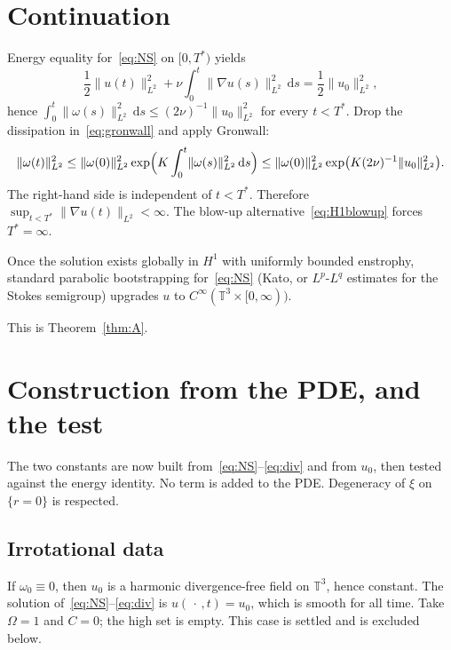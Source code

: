 \documentclass[11pt,a4paper]{article}
\theoremstyle{definition}
\theoremstyle{remark}
\newcommand{\T}{\mathbb{T}}
\newcommand{\norm}[1]{\lVert#1\rVert}
\newcommand{\dd}{\mathrm{d}}
\begin{document}
\section{Continuation}

Energy equality for~\eqref{eq:NS} on \([0,T^*)\) yields
\begin{equation}
\label{eq:energy}
\frac12\norm{u(t)}_{L^2}^2+\nu\int_0^t\norm{\nabla u(s)}_{L^2}^2\,\dd s
=\frac12\norm{u_0}_{L^2}^2,
\end{equation}
hence \(\int_0^{t}\norm{\omega(s)}_{L^2}^2\,\dd s\le (2\nu)^{-1}\norm{u_0}_{L^2}^2\)
for every \(t<T^*\). Drop the dissipation in~\eqref{eq:gronwall} and apply
Gronwall:
\begin{equation}
\label{eq:bound}
\norm{\omega(t)}_{L^2}^2
\le \norm{\omega(0)}_{L^2}^2
\exp\Bigl(K\int_0^t\norm{\omega(s)}_{L^2}^2\,\dd s\Bigr)
\le \norm{\omega(0)}_{L^2}^2
\exp\bigl(K(2\nu)^{-1}\norm{u_0}_{L^2}^2\bigr).
\end{equation}
The right-hand side is independent of \(t<T^*\). Therefore
\(\sup_{t<T^*}\norm{\nabla u(t)}_{L^2}<\infty\). The blow-up
alternative~\eqref{eq:H1blowup} forces \(T^*=\infty\).

Once the solution exists globally in \(H^1\) with uniformly bounded
enstrophy, standard parabolic bootstrapping for~\eqref{eq:NS} (Kato,
or \(L^p\)-\(L^q\) estimates for the Stokes semigroup) upgrades
\(u\) to \(C^\infty(\T^3\times[0,\infty))\).

This is Theorem~\ref{thm:A}.

\section{Construction from the PDE, and the test}
\label{sec:test}

The two constants are now built from~\eqref{eq:NS}--\eqref{eq:div} and
from \(u_0\), then tested against the energy identity. No term is added
to the PDE. Degeneracy of \(\xi\) on \(\{r=0\}\) is respected.

\subsection{Irrotational data}

If \(\omega_0\equiv 0\), then \(u_0\) is a harmonic divergence-free field
on \(\T^3\), hence constant. The solution of~\eqref{eq:NS}--\eqref{eq:div}
is \(u(\,\cdot\,,t)=u_0\), which is smooth for all time. Take
\(\Omega=1\) and \(C=0\); the high set is empty. This case is settled
and is excluded below.
\end{document}
